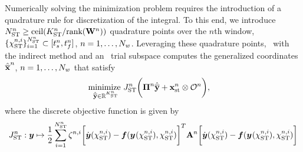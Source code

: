 Numerically solving the minimization problem requires the introduction of a quadrature rule for 
discretization of the integral. To this end, we introduce $N_{\text{ST}}^{n} \ge \text{ceil}(K_{\text{ST}}^{n}/ \text{rank}(\mathbf{W}^{n}))$ quadrature points over the $n$th window, $ \{ \chi_{\text{ST}}^{n,i} \}_{i=1}^{N_{\text{ST}}^{n}} \subset [t_s^{n},t_f^{n}]$, $n=1,\ldots,N_w$. 
Leveraging these quadrature points, \methodAcronym\ with the indirect method and an \spaceTimeAcronym\ trial subspace computes the generalized coordinates 
$\hat{\mathbf{\overline{x}}}^{n}$, $n=1,\ldots,N_w$ that satisfy
\begin{equation}\label{eq:obj_gen_slab2} 
\begin{split}
&\underset{\stgenstatey \in \RR{\stdimArg{n}}}{\text{minimize }} \objectiveDiscreteSTArg{n} \bigg( \stbasisArgnt{n} \stgenstatey + \stateInterceptSTArg{n} \otimes \onesFunctionArg{n}  \bigg) , %
\end{split} 
\end{equation}
where the discrete objective function is given by
$$J_{\text{ST}}^{n}: \boldsymbol y \mapsto \frac{1}{2}\sum_{i=1}^{N_{\text{ST}}^{n}} \zeta^{n,i} 
\bigg[ \dot{\boldsymbol y}(\chi_{\text{ST}}^{n,i})  - \boldsymbol f (\boldsymbol y^{}(\chi_{\text{ST}}^{n,i}),\chi_{\text{ST}}^{n,i} ) \bigg]^T 
\mathbf{A}^{n} 
\bigg[ \dot{\boldsymbol y}(\chi_{\text{ST}}^{n,i})  - \boldsymbol f (\boldsymbol y^{}(\chi_{\text{ST}}^{n,i}),\chi_{\text{ST}}^{n,i} ) \bigg]
$$
